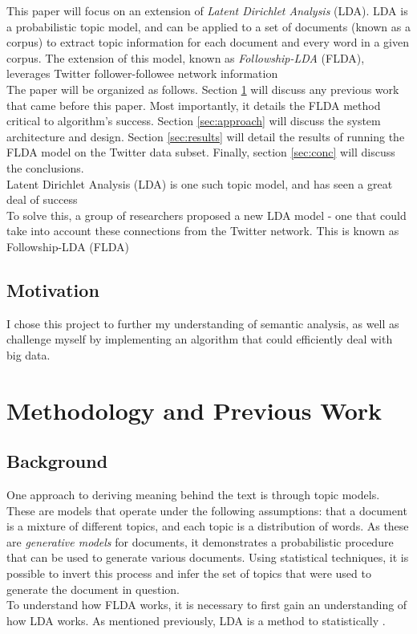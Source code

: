 \documentclass[a4paper]{article}
\begin{document}
\begin{multicols}{2}
This paper will focus on an extension of \textit{Latent Dirichlet Analysis} (LDA). LDA is a probabilistic topic model, and can be applied to a set of documents (known as a corpus) to extract topic information for each document and every word in a given corpus. The extension of this model, known as \textit{Followship-LDA} (FLDA), leverages Twitter follower-followee network information \\

The paper will be organized as follows. Section \ref{sec:prevwork} will discuss any previous work that came before this paper. Most importantly, it details the FLDA method critical to algorithm's success. Section \ref{sec:approach} will discuss the system architecture and design. Section \ref{sec:results} will detail the results of running the FLDA model on the Twitter data subset. Finally, section \ref{sec:conc} will discuss the conclusions. \\

Latent Dirichlet Analysis (LDA) is one such topic model, and has seen a great deal of success \\

To solve this, a group of researchers proposed a new LDA model - one that could take into account these connections from the Twitter network. This is known as Followship-LDA (FLDA) \\
\cite{flda}


\subsection{Motivation}
I chose this project to further my understanding of semantic analysis, as well as challenge myself by implementing an algorithm that could efficiently deal with big data.


\section{Methodology and Previous Work}
\label{sec:prevwork}
\subsection{Background}
One approach to deriving meaning behind the text is through topic models. These are models that operate under the following assumptions: that a document is a mixture of different topics, and each topic is a distribution of words. As these are \textit{generative models} for documents, it demonstrates a probabilistic procedure that can be used to generate various documents. Using statistical techniques, it is possible to invert this process and infer the set of topics that were used to generate the document in question. \\
To understand how FLDA works, it is necessary to first gain an understanding of how LDA works. As mentioned previously, LDA is a method to statistically 
\cite{lda}. \\

\end{multicols}
\end{document}
